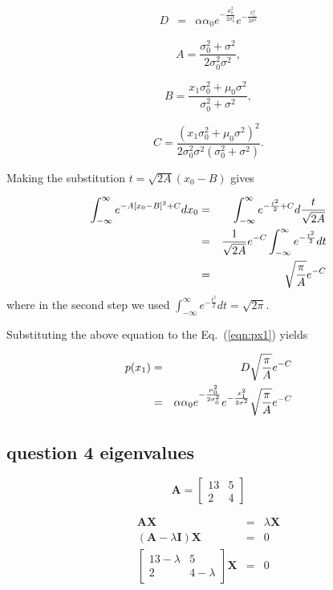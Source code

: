 \documentclass[english,11pt]{article}
\begin{document}
\begin{eqnarray}
D & = & \alpha\alpha_{0}e^{-\frac{\mu_{0}^{2}}{2\sigma_{0}^{2}}}e^{-\frac{x_{1}^{2}}{2\sigma^{2}}}
\end{eqnarray}

\begin{equation}
A=\frac{\sigma_{0}^{2}+\sigma^{2}}{2\sigma_{0}^{2}\sigma^{2}},    
\end{equation}


\begin{equation}
B=\frac{x_{1}\sigma_{0}^{2}+\mu_{0}\sigma^{2}}{\sigma_{0}^{2}+\sigma^{2}},
\end{equation}


\begin{equation}
C=\frac{(x_{1}\sigma_{0}^{2}+\mu_{0}\sigma^{2})^{2}}{2\sigma_{0}^{2}\sigma^{2}(\sigma_{0}^{2}+\sigma^{2})}.    
\end{equation}


Making the substitution $t=\sqrt{2A}(x_{0}-B)$ gives

\begin{eqnarray}
\int_{-\infty}^{\infty}e^{-A[x_{0}-B]^{2}+C}dx_{0} & = & \int_{-\infty}^{\infty}e^{-\frac{t^{2}}{2}+C}d\frac{t}{\sqrt{2A}} \notag \\
 & = & \frac{1}{\sqrt{2A}}e^{-C}\int_{-\infty}^{\infty}e^{-\frac{t^{2}}{2}}dt \notag \\
 & = & \sqrt{\frac{\pi}{A}}e^{-C}
\end{eqnarray}
where in the second step we used $\int_{-\infty}^{\infty}e^{-\frac{t^{2}}{2}}dt=\sqrt{2\pi}$. 

Substituting the above equation to the Eq.~(\ref{eqn:px1}) yields

\begin{eqnarray}
p(x_{1}) & = & D\sqrt{\frac{\pi}{A}}e^{-C} \notag \\
 & = & \alpha\alpha_{0}e^{-\frac{\mu_{0}^{2}}{2\sigma_{0}^{2}}}e^{-\frac{x_{1}^{2}}{2\sigma^{2}}}\sqrt{\frac{\pi}{A}}e^{-C}
\end{eqnarray}

\subsection{question 4 eigenvalues}

\[
\boldsymbol{A}=\left[\begin{array}{cc}
13 & 5\\
2 & 4
\end{array}\right]
\]

\begin{eqnarray*}
\boldsymbol{A}\boldsymbol{X} & = & \lambda\boldsymbol{X}\\
(\boldsymbol{A}-\lambda\boldsymbol{I})\boldsymbol{X} & = & 0\\
\left[\begin{array}{cc}
13-\lambda & 5\\
2 & 4-\lambda
\end{array}\right]\boldsymbol{X} & = & 0
\end{eqnarray*}
\end{document}
